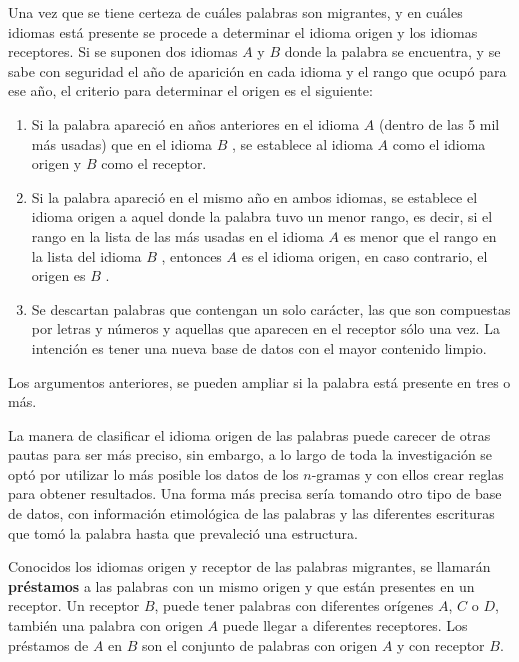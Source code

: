 Una vez que se tiene certeza de cuáles palabras son migrantes, y en cuáles
idiomas está presente se procede a determinar el idioma origen y los idiomas
receptores.   Si se suponen dos idiomas $\textit{A}$ y $\textit{B}$  donde la
palabra se encuentra, y se sabe con seguridad el año de aparición en cada
idioma y el rango que ocupó para ese año,  el criterio para determinar el
origen es el siguiente: 
\begin{enumerate}
\item  Si la palabra apareció en años anteriores en el idioma $\textit{A}$
(dentro de las 5 mil más usadas) que en el idioma $\textit{B}$ , se establece
al idioma $\textit{A}$  como el idioma origen y $\textit{B}$  como el receptor.
\item Si la palabra apareció en el mismo año en ambos idiomas, se establece el
idioma origen a aquel donde la palabra tuvo un menor rango, es decir, si el
rango en la lista de las más usadas en el idioma $\textit{A}$  es menor que el
rango en la lista del idioma $\textit{B}$ , entonces $\textit{A}$  es el idioma
origen, en caso contrario, el origen es $\textit{B}$ .
\item Se descartan palabras que contengan un solo carácter, las que son
compuestas por letras y números y aquellas que aparecen en el receptor sólo una
vez. La intención es tener una  nueva base de datos con el mayor contenido
limpio. 
\end{enumerate}
Los argumentos anteriores, se pueden ampliar si la palabra está presente en
tres o más.

{}
La manera de clasificar el idioma origen de las palabras puede carecer de otras
pautas para ser más preciso, sin embargo, a lo largo de toda la investigación
se optó por utilizar lo más posible los datos de los $n$-gramas y  con ellos
crear reglas para obtener resultados.  Una forma más precisa sería tomando otro
tipo de base de datos, con información etimológica de las palabras y las
diferentes escrituras que tomó la palabra hasta que prevaleció una estructura.  

Conocidos los idiomas origen y receptor de las palabras migrantes, se llamarán
\textbf{préstamos} a las palabras con un mismo origen y que están  presentes en
un receptor.  Un receptor $\textit{B}$, puede tener palabras con diferentes
orígenes $\textit{A}$, $\textit{C}$ o $\textit{D}$, también una palabra con
origen $\textit{A}$ puede llegar a diferentes receptores.  Los préstamos de
$\textit{A}$  en $\textit{B}$  son el conjunto de palabras con origen
$\textit{A}$  y con receptor $\textit{B}$.     



